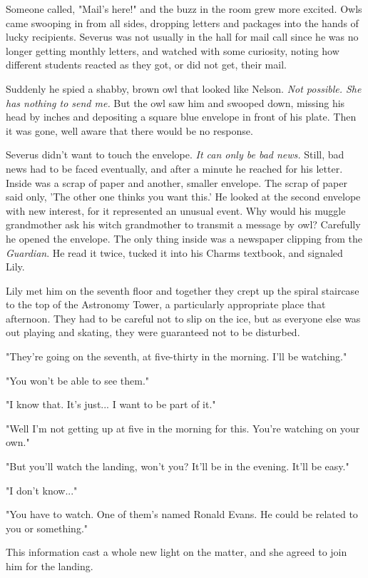 \documentclass[a4paper,11pt]{article}
\begin{document}
Someone called, "Mail's here!" and the buzz in the room grew more excited. Owls came swooping in from all sides, dropping letters and packages into the hands of lucky recipients. Severus was not usually in the hall for mail call since he was no longer getting monthly letters, and watched with some curiosity, noting how different students reacted as they got, or did not get, their mail.

Suddenly he spied a shabby, brown owl that looked like Nelson. \emph{Not possible. She has nothing to send me.} But the owl saw him and swooped down, missing his head by inches and depositing a square blue envelope in front of his plate. Then it was gone, well aware that there would be no response.

Severus didn't want to touch the envelope. \emph{It can only be bad news.} Still, bad news had to be faced eventually, and after a minute he reached for his letter. Inside was a scrap of paper and another, smaller envelope. The scrap of paper said only, 'The other one thinks you want this.' He looked at the second envelope with new interest, for it represented an unusual event. Why would his muggle grandmother ask his witch grandmother to transmit a message by owl? Carefully he opened the envelope. The only thing inside was a newspaper clipping from the \emph{Guardian}. He read it twice, tucked it into his Charms textbook, and signaled Lily.

Lily met him on the seventh floor and together they crept up the spiral staircase to the top of the Astronomy Tower, a particularly appropriate place that afternoon. They had to be careful not to slip on the ice, but as everyone else was out playing and skating, they were guaranteed not to be disturbed.

"They're going on the seventh, at five-thirty in the morning. I'll be watching."

"You won't be able to see them."

"I know that. It's just... I want to be part of it."

"Well I'm not getting up at five in the morning for this. You're watching on your own."

"But you'll watch the landing, won't you? It'll be in the evening. It'll be easy."

"I don't know..."

"You have to watch. One of them's named Ronald Evans. He could be related to you or something."

This information cast a whole new light on the matter, and she agreed to join him for the landing.
\end{document}
